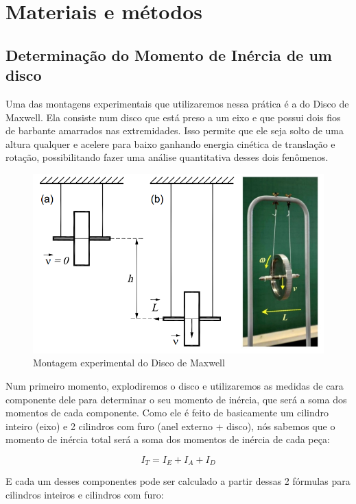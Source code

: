 \newpage
\section{Materiais e métodos}


\subsection{Determinação do Momento de Inércia de um disco}

Uma das montagens experimentais que utilizaremos nessa prática é a do Disco de Maxwell. Ela consiste num disco que está preso a um eixo e que possui dois fios de barbante amarrados nas extremidades. Isso permite que ele seja solto de uma altura qualquer e acelere para baixo ganhando energia cinética de translação e rotação, possibilitando fazer uma análise quantitativa desses dois fenômenos. 

\begin{figure}[H]
  \centering
  \includegraphics[scale=0.5]{images/setup-maxwell.png}
  \caption{Montagem experimental do Disco de Maxwell}
\end{figure}

Num primeiro momento, explodiremos o disco e utilizaremos as medidas de cara componente dele para determinar o seu momento de inércia, que será a soma dos momentos de cada componente. Como ele é feito de basicamente um cilindro inteiro (eixo) e 2 cilindros com furo (anel externo + disco), nós sabemos que o momento de inércia total será a soma dos momentos de inércia de cada peça:

\[I_T = I_E + I_A + I_D\]

E cada um desses componentes pode ser calculado a partir dessas 2 fórmulas para cilindros inteiros e cilindros com furo:

